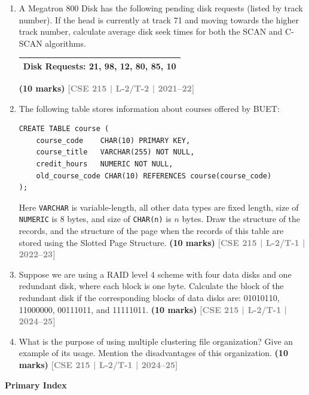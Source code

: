 \documentclass[12pt,a3paper]{article}
\newcommand{\yr}[1]{\hfill\textcolor{gray}{\small\textbf{[#1]}}}
\newcommand{\mk}[1]{\textcolor{orange!70!black}{\small\textbf{(#1 marks)}}}
\newcommand{\subtopic}[2]{%
  \vspace{10pt}
  \noindent\begin{tcolorbox}[colback=#1!8,colframe=#1,boxrule=0.6pt,arc=4pt,
    left=6pt,right=6pt,top=4pt,bottom=4pt]
    \small\bfseries\textcolor{#1}{#2}
  \end{tcolorbox}
  \vspace{2pt}
}
\begin{document}
\begin{enumerate}
\item A Megatron 800 Disk has the following pending disk requests (listed by track number). If the head is currently at track 71 and moving towards the higher track number, calculate average disk seek times for both the SCAN and C-SCAN algorithms.

\medskip
\begin{center}
\begin{tabular}{l}
\toprule
\textbf{Disk Requests}: 21, 98, 12, 80, 85, 10\\
\bottomrule
\end{tabular}
\end{center}
\mk{10} \yr{CSE 215 | L-2/T-2 | 2021--22}

\item The following table stores information about courses offered by BUET:
\begin{lstlisting}
CREATE TABLE course (
    course_code    CHAR(10) PRIMARY KEY,
    course_title   VARCHAR(255) NOT NULL,
    credit_hours   NUMERIC NOT NULL,
    old_course_code CHAR(10) REFERENCES course(course_code)
);
\end{lstlisting}
Here \texttt{VARCHAR} is variable-length, all other data types are fixed length, size of \texttt{NUMERIC} is 8 bytes, and size of \texttt{CHAR(n)} is $n$ bytes. Draw the structure of the records, and the structure of the page when the records of this table are stored using the Slotted Page Structure.
 \mk{10} \yr{CSE 215 | L-2/T-1 | 2022--23}

\item Suppose we are using a RAID level 4 scheme with four data disks and one redundant disk, where each block is one byte. Calculate the block of the redundant disk if the corresponding blocks of data disks are: 01010110, 11000000, 00111011, and 11111011.
\mk{10} \yr{CSE 215 | L-2/T-1 | 2024--25}

\item What is the purpose of using multiple clustering file organization? Give an example of its usage. Mention the disadvantages of this organization.
\mk{10} \yr{CSE 215 | L-2/T-1 | 2024--25}

\end{enumerate}

\subtopic{cD}{Primary Index}
\label{sub:s5-primary}
\end{document}
